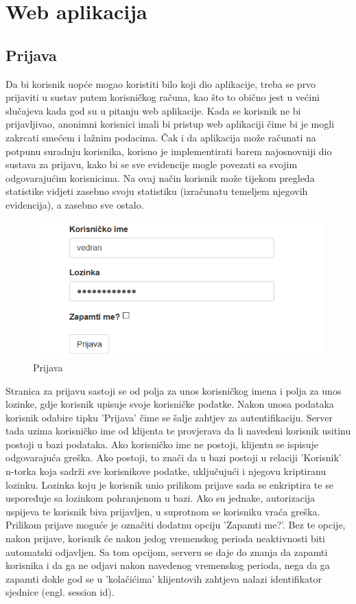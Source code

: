 \documentclass[times, utf8, zavrsni]{fer}
\begin{document}
\chapter{Web aplikacija}

\section{Prijava}
Da bi korisnik uopće mogao koristiti bilo koji dio aplikacije, treba se prvo prijaviti u sustav putem korisničkog računa, kao što to obično jest u većini slučajeva kada god su u pitanju web aplikacije. Kada se korisnik ne bi prijavljivao, anonimni korisnici imali bi pristup web aplikaciji čime bi je mogli zakrcati smećem i lažnim podacima. Čak i da aplikacija može računati na potpunu suradnju korisnika, korisno je implementirati barem najosnovniji dio sustava za prijavu, kako bi se sve evidencije mogle povezati sa svojim odgovarajućim korisnicima. Na ovaj način korisnik može tijekom pregleda statistike vidjeti zasebno svoju statistiku (izračunatu temeljem njegovih evidencija), a zasebno sve ostalo.\\

\begin{figure}[H]
\centering
\includegraphics[width=\textwidth,height=\textheight,keepaspectratio]{img/prijava.png}
\caption{Prijava}
\label{fig:prijava}
\end{figure}
\clearpage

Stranica za prijavu sastoji se od polja za unos korisničkog imena i polja za unos lozinke, gdje korisnik upisuje svoje korisničke podatke. Nakon unosa podataka korisnik odabire tipku 'Prijava' čime se šalje zahtjev za autentifikaciju. Server tada uzima korisničko ime od klijenta te provjerava da li navedeni korisnik usitinu postoji u bazi podataka. Ako korisničko ime ne postoji, klijentu se ispisuje odgovarajuća greška. Ako postoji, to znači da u bazi postoji u relaciji 'Korisnik' n-torka koja sadrži sve korisnikove podatke, uključujući i njegovu kriptiranu lozinku. Lozinka koju je korisnik unio prilikom prijave sada se enkriptira te se uspoređuje sa lozinkom pohranjenom u bazi. Ako su jednake, autorizacija uspijeva te korisnik biva prijavljen, u suprotnom se korisniku vraća greška.
Prilikom prijave moguće je označiti dodatnu opciju 'Zapamti me?'. Bez te opcije, nakon prijave, korisnik će nakon jedog vremenskog perioda neaktivnosti biti automatski odjavljen. Sa tom opcijom, serveru se daje do znanja da zapamti korisnika i da ga ne odjavi nakon navedenog vremenskog perioda, nega da ga zapamti dokle god se u 'kolačićima' klijentovih zahtjeva nalazi identifikator sjednice (engl. session id).
\end{document}
